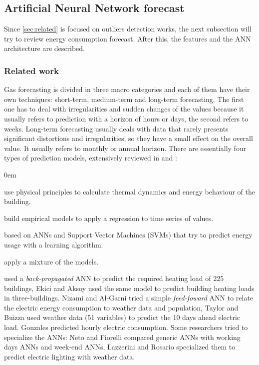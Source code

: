\documentclass{sig-alternate-sigmod07}
\begin{document}
\subsection{Artificial Neural Network forecast}
\label{sec:predictor}
Since \cref{sec:related} is focused on outliers detection works, the next subsection will try to review energy consumption forecast. After this, the features and the ANN architecture are described.


\subsubsection{Related work}
Gas forecasting is divided in three macro categories and each of them have their own techniques: short-term, medium-term and long-term forecasting. The first one has to deal with irregularities and sudden changes of the values because it usually refers to prediction with a horizon of hours or days, the second refers to weeks. Long-term forecasting usually deals with data that rarely presents significant distortions and irregularities, so they have a small effect on the overall value. It usually refers to monthly or annual horizon. 
There are essentially four types of prediction models, extensively reviewed in \cite{zhao2012review} and \cite{hippert2001neural}: \begin{description}[font=\normalfont\itshape,leftmargin=1pc]
\itemsep0em
  \item[Engineering methods] use physical principles to calculate thermal dynamics and energy behaviour of the building.
  \item[Statistical methods] build empirical models to apply a regression to time series of values.
  \item[Machine learning methods] based on ANNs and Support Vector Machines (SVMs) that try to predict energy usage with a learning algorithm.
\item[Grey models] apply a mixture of the models. 
\end{description}




\cite{kalogirou2006artificial} used a \emph{back-propagated} ANN to predict the required heating load of 225 buildings, Ekici and Aksoy used the same model to predict building heating loads in three-buildings. Nizami and Al-Garni \cite{JaveedNizami19951097} tried a simple \emph{feed-foward} ANN to relate the electric energy consumption to weather data and population, Taylor and Buizza \cite{taylor2002neural} used weather data (51 variables) to predict the 10 days ahead electric load. Gonzales \cite{gonzalez2005prediction} predicted hourly electric consumption.
Some researchers tried to specialize the ANNs: Neto and Fiorelli \cite{neto2008comparison} compared generic ANNs with working days ANNs and week-end ANNs, Lazzerini and Rosario \cite{d2012neural} specialized them to predict electric lighting with weather data. %
\end{document}
